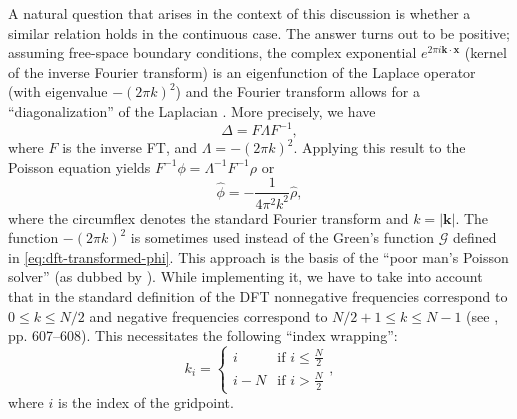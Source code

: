 A natural question that arises in the context of this discussion is whether a similar relation holds in the continuous case.
The answer turns out to be positive;
assuming free-space boundary conditions, the complex exponential $e^{2\pi i \mathbf{k} \cdot \mathbf{x}}$ (kernel of the inverse Fourier transform) is an eigenfunction of the Laplace operator (with eigenvalue $-(2\pi k)^2$) and the Fourier transform allows for a ``diagonalization'' of the Laplacian \cite{demanet2013fourier}.
More precisely, we have
\begin{equation*}
    \Delta = F \Lambda F^{-1},
\end{equation*}
where $F$ is the inverse FT, and $\Lambda = -(2\pi k)^2$.
Applying this result to the Poisson equation yields $F^{-1}\phi = \Lambda^{-1}F^{-1}\rho$ or
\begin{equation}\label{eq:poor-mans-poisson-solver}
    \hat\phi = -\frac{1}{4\pi^2 k^2} \hat\rho,
\end{equation}
where the circumflex denotes the standard Fourier transform and $k = |\mathbf{k}|$.
The function $-(2\pi k)^2$ is sometimes used instead of the Green's function $\mathcal{G}$ defined in \autoref{eq:dft-transformed-phi}.
This approach is the basis of the ``poor man's Poisson solver'' (as dubbed by \cite{Hockney1988}).
While implementing it, we have to take into account that in the standard definition of the DFT nonnegative frequencies correspond to $0 \leq k \leq N/2$ and negative frequencies correspond to $N/2+1 \leq k \leq N-1$ (see \cite{press2007numerical}, pp. 607--608).
This necessitates the following ``index wrapping'':
\begin{equation*}
    k_i =
    \begin{cases}
        i     & \text{if } i \leq \frac{N}{2} \\
        i - N & \text{if } i > \frac{N}{2}
    \end{cases},
\end{equation*}
where $i$ is the index of the gridpoint.
